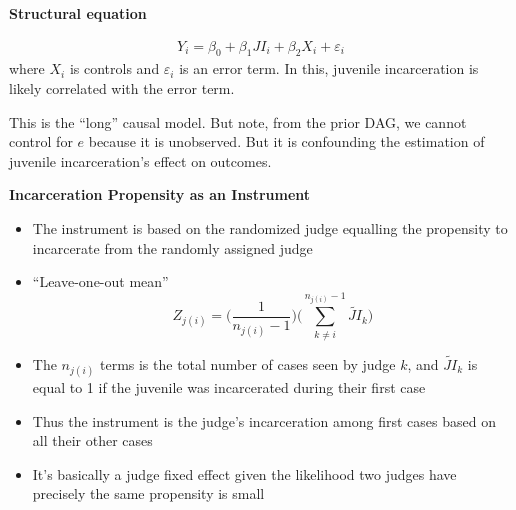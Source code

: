 \documentclass[notes=show]{beamer}
\begin{document}
\begin{frame}[plain]

\begin{center}
\textbf{Structural equation}
\end{center}

\begin{eqnarray*}
Y_i = \beta_0 + \beta_1 JI_i + \beta_2 X_i + \varepsilon_i
\end{eqnarray*}where $X_i$ is controls and $\varepsilon_i$ is an error term.  In this, juvenile incarceration is likely correlated with the error term.

\bigskip

This is the ``long'' causal model. But note, from the prior DAG, we cannot control for $e$ because it is unobserved. But it is confounding the estimation of juvenile incarceration's effect on outcomes.

\end{frame}

\begin{frame}[plain]
\begin{center}
\textbf{Incarceration Propensity as an Instrument}
\end{center}

	\begin{itemize}
	\item The instrument is based on the randomized judge equalling the propensity to incarcerate from the randomly assigned judge
	\item ``Leave-one-out mean''$$Z_{j(i)} = \bigg ( \frac{1}{n_{j(i)} - 1} \bigg ) \bigg ( \sum_{k \neq i}^{n_{j(i)}-1} \widetilde{JI}_k \bigg )$$
	\item The $n_{j(i)}$ terms is the total number of cases seen by judge $k$, and $\widetilde{JI}_k$ is equal to 1 if the juvenile was incarcerated during their first case
	\item Thus the instrument is the judge's incarceration among first cases based on all their other cases
	\item It's basically a judge fixed effect given the likelihood two judges have precisely the same propensity is small
	\end{itemize}
\end{frame}
\end{document}
